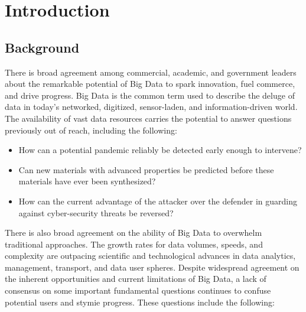 \section{Introduction}

\subsection{Background}

There is broad agreement among commercial, academic, and government
leaders about the remarkable potential of Big Data to spark
innovation, fuel commerce, and drive progress. Big Data is the common
term used to describe the deluge of data in today's networked,
digitized, sensor-laden, and information-driven world. The
availability of vast data resources carries the potential to answer
questions previously out of reach, including the following:

\begin{itemize}
\item How can a potential pandemic reliably be detected early enough
  to intervene?
\item Can new materials with advanced properties be predicted before
  these materials have ever been synthesized?
\item How can the current advantage of the attacker over the defender
  in guarding against cyber-security threats be reversed?
\end{itemize}

There is also broad agreement on the ability of Big Data to overwhelm
traditional approaches. The growth rates for data volumes, speeds, and
complexity are outpacing scientific and technological advances in data
analytics, management, transport, and data user spheres.  Despite
widespread agreement on the inherent opportunities and current
limitations of Big Data, a lack of consensus on some important
fundamental questions continues to confuse potential users and stymie
progress. These questions include the following:

